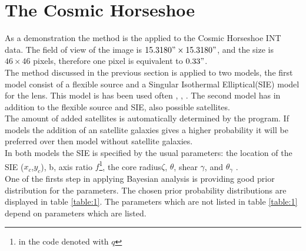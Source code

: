 \documentclass[useAMS,usenatbib]{mn2e}
\begin{document}
\section{The Cosmic Horseshoe}
As a demonstration the method is the applied to the Cosmic Horseshoe INT data. 
The field of view of the image is $15.3180" \times 15.3180"$, and the size is $46 \times 46$ pixels, therefore one pixel is equivalent to $0.33"$. \\
The method discussed  in the previous section is applied to two models, the first model consist of a flexible source and a Singular Isothermal Elliptical(SIE) model for the lens. This model is has been used often  \cite{Dye2008}, \cite{schneider_falcoa_Ehlers_1994},      . 
The second model has in addition to the flexible source and SIE, also possible satellites. \\
The amount of added satellites is automatically determined by the program. If models the addition of an satellite galaxies gives a higher probability it will be preferred over then model without satellite galaxies.  \\
In both models the SIE is specified by the usual parameters: the location of the SIE ($x_c$,$y_c$), b, axis ratio $f$\footnote{in the code denoted with $q$},  the core radius$\zeta$, $\theta$, shear $\gamma$, and $\theta_{\gamma}$ \cite{kormann_schneider_1994}.\\
One of the firsts step in applying Bayesian analysis is providing good prior distribution for the parameters. 
The chosen prior probability distributions are displayed in table \ref{table:1}. The parameters which are not listed in table 
\ref{table:1} depend on parameters which are listed. 
\end{document}
